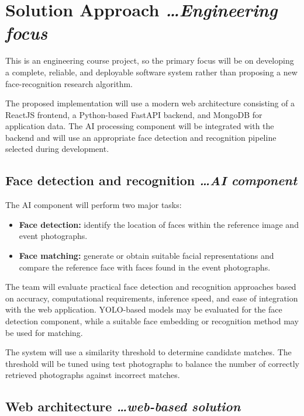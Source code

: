\documentclass[11pt,a4paper]{article}
\newcommand{\BvrHint}[1]{%
  {\normalfont\normalsize\itshape\hfill #1}}
\begin{document}
\section{Solution Approach %
  \BvrHint{\ldots Engineering focus}}

This is an engineering course project, so the primary focus will be on
developing a complete, reliable, and deployable software system rather
than proposing a new face-recognition research algorithm.

The proposed implementation will use a modern web architecture
consisting of a ReactJS frontend, a Python-based FastAPI backend, and
MongoDB for application data. The AI processing component will be
integrated with the backend and will use an appropriate face detection
and recognition pipeline selected during development.

\subsection{Face detection and recognition %
  \BvrHint{\ldots AI component}}

The AI component will perform two major tasks:

\begin{itemize}[leftmargin=0.7cm]
    \item \textbf{Face detection:} identify the location of faces within
    the reference image and event photographs.

    \item \textbf{Face matching:} generate or obtain suitable facial
    representations and compare the reference face with faces found in
    the event photographs.
\end{itemize}

The team will evaluate practical face detection and recognition
approaches based on accuracy, computational requirements, inference
speed, and ease of integration with the web application. YOLO-based
models may be evaluated for the face detection component, while a
suitable face embedding or recognition method may be used for matching.

The system will use a similarity threshold to determine candidate
matches. The threshold will be tuned using test photographs to balance
the number of correctly retrieved photographs against incorrect
matches.

\subsection{Web architecture %
  \BvrHint{\ldots web-based solution}}
\end{document}
